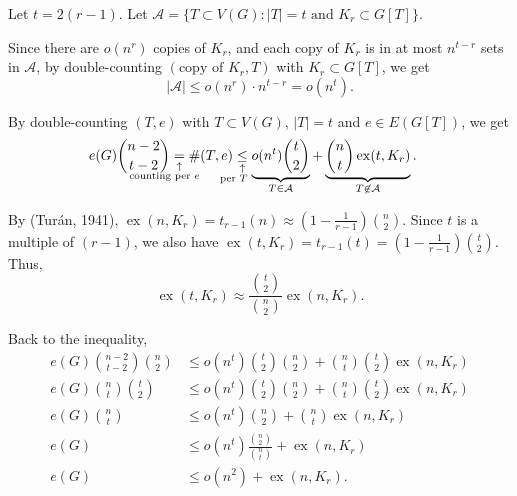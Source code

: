 \documentclass[10pt, a4paper]{article}
\DeclareMathOperator\ex{ex}
\newcommand{\signexpl}[3]{%
  \underset{\substack{\uparrow\\\mathrlap{\text{\hspace{#3}#2}}}}{#1}}
\begin{document}
\begin{dem}
	Let $t = 2(r-1)$.
	Let $\mathcal A = \{T \subset V(G) : |T| = t \text{ and } K_r \subset G[T]\}$.

	Since there are $o(n^r)$ copies of $K_r$, and each copy of $K_r$ is in at most $n^{t-r}$ sets in $\mathcal A$, by double-counting $(\text{copy of }K_r, T)$ with $K_r \subset G[T]$, we get  \[
		|\mathcal A| \leqslant o(n^r) \cdot n^{t-r} = o(n^t).
	\]

	By double-counting $(T, e)$ with $T \subset V(G)$, $|T| = t$ and $e \in E(G[T])$, we get
	\begin{align*}
		e(G) \binom{n-2}{t-2} \signexpl{=}{counting per $e$}{-4.5em}
			\#(T, e) &\signexpl{\le}{per $T$}{-2em}
			\underbrace{o(n^t)\binom{t}{2}}_{T \in \mathcal A} + 
			\underbrace{\binom{n}{t}\ex(t, K_r)}_{T \not\in \mathcal A}.
	\end{align*}

	By (Turán, 1941), $\ex(n, K_r) = t_{r-1}(n) \approx (1 - \frac{1}{r-1})\binom{n}{2}$. Since $t$ is a multiple of $(r - 1)$, we also have $\ex(t, K_r) = t_{r-1}(t) = (1 - \frac{1}{r-1})\binom{t}{2}$. Thus, \[
		\ex(t, K_r) \approx \frac{\binom{t}{2}}{\binom{n}{2}} \ex(n, K_r).
	\]

	Back to the inequality,
	\begin{align*}
		e(G)\binom{n-2}{t-2}\binom{n}{2} &\leqslant o(n^t)\binom{t}{2}\binom{n}{2} + \binom{n}{t}\binom{t}{2} \ex(n, K_r)\\
		e(G)\binom{n}{t}\binom{t}{2} &\leqslant o(n^t)\binom{t}{2}\binom{n}{2} + \binom{n}{t}\binom{t}{2} \ex(n, K_r)\\
		e(G)\binom{n}{t} &\leqslant o(n^t)\binom{n}{2} + \binom{n}{t} \ex(n, K_r)\\
		e(G) &\leqslant o(n^t)\frac{\binom{n}{2}}{\binom{n}{t}} + \ex(n, K_r)\\
		e(G) &\leqslant o(n^2) + \ex(n, K_r).
	\end{align*}
\end{dem}
\end{document}
